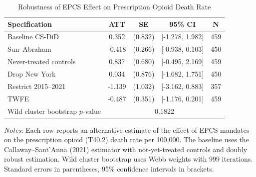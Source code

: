 \begin{table}[H]
\centering
\caption{Robustness of EPCS Effect on Prescription Opioid Death Rate}
\label{tab:robustness}
\begin{threeparttable}
\begin{tabular}{lcccc}
\toprule
Specification & ATT & SE & 95\% CI & N \\
\midrule
Baseline CS-DiD & 0.352 & (0.832) & [-1.278, 1.982] & 459 \\
Sun--Abraham & -0.418 & (0.266) & [-0.938, 0.103] & 450 \\
Never-treated controls & 0.837 & (0.680) & [-0.495, 2.169] & 459 \\
Drop New York & 0.034 & (0.876) & [-1.682, 1.751] & 450 \\
Restrict 2015--2021 & -1.139 & (1.032) & [-3.162, 0.883] & 357 \\
TWFE & -0.487 & (0.351) & [-1.176, 0.201] & 459 \\
\midrule
Wild cluster bootstrap $p$-value & \multicolumn{4}{c}{0.1822} \\
\bottomrule
\end{tabular}
\begin{tablenotes}[flushleft]
\small
\item \textit{Notes:} Each row reports an alternative estimate of the effect of EPCS mandates on the prescription opioid (T40.2) death rate per 100,000. The baseline uses the Callaway--Sant'Anna (2021) estimator with not-yet-treated controls and doubly robust estimation. Wild cluster bootstrap uses Webb weights with 999 iterations. Standard errors in parentheses, 95\% confidence intervals in brackets.
\end{tablenotes}
\end{threeparttable}
\end{table}
